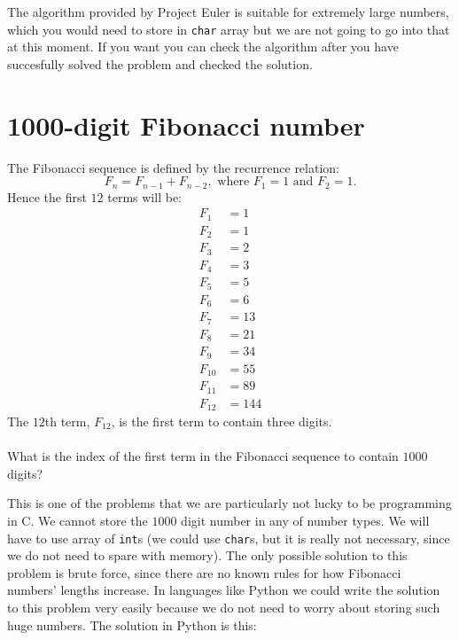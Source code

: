 \documentclass{book}
\newenvironment{task}
  {\begin{mdframed}[backgroundcolor=lightgray]}
  {\end{mdframed}}
\begin{document}
The algorithm provided by Project Euler is suitable for extremely large numbers, which you would need to store in \texttt{char} array but we are not going to go into that at this moment. If you want you can check the algorithm after you have succesfully solved the problem and checked the solution.


\setcounter{section}{24}
\section{1000-digit Fibonacci number}

\begin{task}
The Fibonacci sequence is defined by the recurrence relation:
\[F_n = F_{n-1} + F_{n-2},\textrm{ where $F_1 = 1$ and $F_2 = 1$}.\]
Hence the first $12$ terms will be:
\begin{align*}
F_1 &= 1\\
F_2 &= 1\\
F_3 &= 2\\
F_4 &= 3\\
F_5 &= 5\\
F_6 &= 6\\
F_7 &= 13\\
F_8 &= 21\\
F_9 &= 34\\
F_{10} &= 55\\
F_{11} &= 89\\
F_{12} &= 144
\end{align*}
The $12$th term, $F_{12}$, is the first term to contain three digits.\\
\\
What is the index of the first term in the Fibonacci sequence to contain $1000$ digits?
\end{task}

This is one of the problems that we are particularly not lucky to be programming in C. We cannot store the $1000$ digit number in any of number types. We will have to use array of \texttt{int}s (we could use \texttt{char}s, but it is really not necessary, since we do not need to spare with memory). The only possible solution to this problem is brute force, since there are no known rules for how Fibonacci numbers' lengths increase. In languages like Python we could write the solution to this problem very easily because we do not need to worry about storing such huge numbers. The solution in Python is this:
\end{document}
